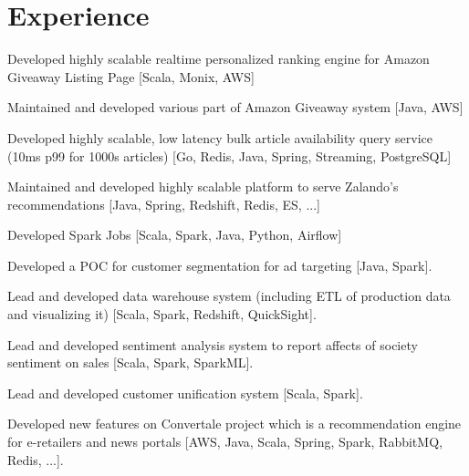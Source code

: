 \documentclass[]{furkanvarol-resume}
\begin{document}
\begin{minipage}[t]{0.66\textwidth}


\section{Experience}

\vspace{\topsep} %
\begin{tightemize}
\item Developed highly scalable realtime personalized ranking engine for Amazon Giveaway Listing Page [Scala, Monix, AWS]
\item Maintained and developed various part of Amazon Giveaway system [Java, AWS]
\end{tightemize}
\sectionsep

\begin{tightemize}
\item Developed highly scalable, low latency bulk article availability query service (10ms p99 for 1000s articles) [Go, Redis, Java, Spring, Streaming, PostgreSQL]
\item Maintained and developed highly scalable platform to serve Zalando's recommendations [Java, Spring, Redshift, Redis, ES, ...]
\item Developed Spark Jobs [Scala, Spark, Java, Python, Airflow]
\end{tightemize}
\sectionsep

\begin{tightemize}
\item Developed a POC for customer segmentation for ad targeting [Java, Spark].
\item Lead and developed data warehouse system (including ETL of production data and visualizing it) [Scala, Spark, Redshift, QuickSight].
\item Lead and developed sentiment analysis system to report affects of society sentiment on sales [Scala, Spark, SparkML].
\item Lead and developed customer unification system [Scala, Spark].
\item Developed new features on Convertale project which is a recommendation engine for e-retailers and news portals [AWS, Java, Scala, Spring, Spark, RabbitMQ, Redis, ...].
\end{tightemize}
\sectionsep


\end{minipage}
\end{document}
